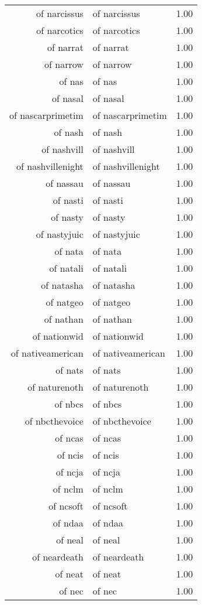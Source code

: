 \begin{table}[ht]
\begin{tabular}{rlr}
  of narcissus & of narcissus & 1.00 \\ 
  of narcotics & of narcotics & 1.00 \\ 
  of narrat & of narrat & 1.00 \\ 
  of narrow & of narrow & 1.00 \\ 
  of nas & of nas & 1.00 \\ 
  of nasal & of nasal & 1.00 \\ 
  of nascarprimetim & of nascarprimetim & 1.00 \\ 
  of nash & of nash & 1.00 \\ 
  of nashvill & of nashvill & 1.00 \\ 
  of nashvillenight & of nashvillenight & 1.00 \\ 
  of nassau & of nassau & 1.00 \\ 
  of nasti & of nasti & 1.00 \\ 
  of nasty & of nasty & 1.00 \\ 
  of nastyjuic & of nastyjuic & 1.00 \\ 
  of nata & of nata & 1.00 \\ 
  of natali & of natali & 1.00 \\ 
  of natasha & of natasha & 1.00 \\ 
  of natgeo & of natgeo & 1.00 \\ 
  of nathan & of nathan & 1.00 \\ 
  of nationwid & of nationwid & 1.00 \\ 
  of nativeamerican & of nativeamerican & 1.00 \\ 
  of nats & of nats & 1.00 \\ 
  of naturenoth & of naturenoth & 1.00 \\ 
  of nbcs & of nbcs & 1.00 \\ 
  of nbcthevoice & of nbcthevoice & 1.00 \\ 
  of ncas & of ncas & 1.00 \\ 
  of ncis & of ncis & 1.00 \\ 
  of ncja & of ncja & 1.00 \\ 
  of nclm & of nclm & 1.00 \\ 
  of ncsoft & of ncsoft & 1.00 \\ 
  of ndaa & of ndaa & 1.00 \\ 
  of neal & of neal & 1.00 \\ 
  of neardeath & of neardeath & 1.00 \\ 
  of neat & of neat & 1.00 \\ 
  of nec & of nec & 1.00 \\ 

\end{tabular}
\end{table}
